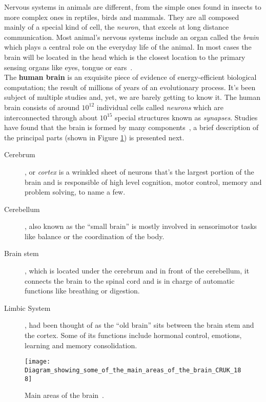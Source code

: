 Nervous systems in animals are different, from the simple ones found in insects to more complex ones in reptiles, birds and mammals. They are all composed mainly of a special kind of cell, the \emph{ neuron}, that excels at long distance communication. Most animal's nervous systems include an organ called the \emph{brain} which plays a central role on the everyday life of the animal. In most cases the brain will be located in the head which is the closest location to the primary sensing organs like eyes, tongue or ears~\cite{scholarpedia-brain}.\\


The \textbf{human brain} is an exquisite piece of evidence of energy-efficient biological computation; the result of millions of years of an evolutionary process. It's been subject of multiple studies and, yet, we are barely getting to know it. The human brain consists of around $10^{12}$ individual cells called \emph{neurons} which are interconnected through about $10^{15}$ special structures known as \emph{synapses}.
Studies have found that the brain is formed by many components~\cite{thompson2000brain}, a brief description of the principal parts (shown in Figure \ref{fig:brain:components}) is presented next. 
\begin{description}
  \item[Cerebrum], or \emph{cortex} is a wrinkled sheet of neurons that's the largest portion of the brain and is responsible of high level cognition, motor control, memory and problem solving, to name a few.
  \item[Cerebellum], also known as the ``small brain'' is mostly involved in sensorimotor tasks like balance or the coordination of the body.
  \item[Brain stem], which is located under the cerebrum and in front of the cerebellum, it connects the brain to the spinal cord and is in charge of automatic functions like breathing or digestion.
  \item[Limbic System], had been thought of as the ``old brain'' sits between the brain stem and the cortex. Some of its functions include hormonal control, emotions, learning and memory consolidation. 
\end{description}

\begin{figure}[hbt]
  \begin{center}
    \texttt{[image: Diagram\_showing\_some\_of\_the\_main\_areas\_of\_the\_brain\_CRUK\_188]}
    \caption{Main areas of the brain~\cite{wikipedia-images}.}
    \label{fig:brain:components}
  \end{center}
  
\end{figure}

